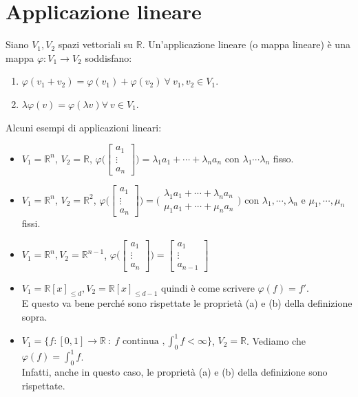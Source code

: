 \newpage
\section{Applicazione lineare}
\begin{definition}
Siano $V_1, V_2$ spazi vettoriali su $\mathbb{R}$. Un'applicazione lineare (o mappa lineare) è una mappa $\varphi: V_1 \to V_2$ soddisfano:
\begin{enumerate}
    \item $\varphi(v_1 + v_2) = \varphi(v_1) + \varphi(v_2) \: \forall \: v_1, v_2 \in V_1$.
    \item $\lambda \varphi(v) = \varphi(\lambda v) \forall \: v \in V_1$.
\end{enumerate}
\end{definition}

\begin{example}
Alcuni esempi di applicazioni lineari:
\begin{itemize}
    \item $V_1 = \mathbb{R}^n$, $V_2 = \mathbb{R}$, $\varphi\Big(\begin{bmatrix}a_1\\\vdots\\a_n\end{bmatrix}\Big) = \lambda_1a_1 + \cdots + \lambda_n a_n$ con $\lambda_1 \cdots \lambda_n$ fisso.
    \item $V_1 = \mathbb{R}^n$, $V_2 = \mathbb{R}^2$, $\varphi\Bigg(\begin{bmatrix}a_1 \\ \vdots \\ a_n\end{bmatrix}\Bigg) = \Bigg(\begin{array}{c}\lambda_1 a_1 + \cdots + \lambda_n a_n \\ \mu_1 a_1 + \cdots + \mu_n a_n\end{array} \Bigg)$ con $\lambda_1, \cdots, \lambda_n$ e $\mu_1, \cdots, \mu_n$ fissi.
    \item $V_1 = \mathbb{R}^n, V_2 = \mathbb{R}^{n-1}$, $\varphi\Bigg(\begin{bmatrix}a_1 \\ \vdots \\ a_n\end{bmatrix}\Bigg) = \begin{bmatrix}a_1 \\ \vdots \\ a_{n-1}\end{bmatrix}$
    \item $V_1 = \mathbb{R}[x]_{\leq d}, V_2 = \mathbb{R}[x]_{\leq d-1}$ quindi è come scrivere $\varphi(f) = f'$. \\
    E questo va bene perché sono rispettate le proprietà (a) e (b) della definizione sopra.
    \item $V_1 = \{f:[0,1]\to \mathbb{R} \::\: f \text{ continua }, \int_0^1 f<\infty\}$, $V_2 = \mathbb{R}$. Vediamo che $\varphi (f) = \int_0^1 f$.\\
    Infatti, anche in questo caso, le proprietà (a) e (b) della definizione sono rispettate.
\end{itemize}
\end{example}


